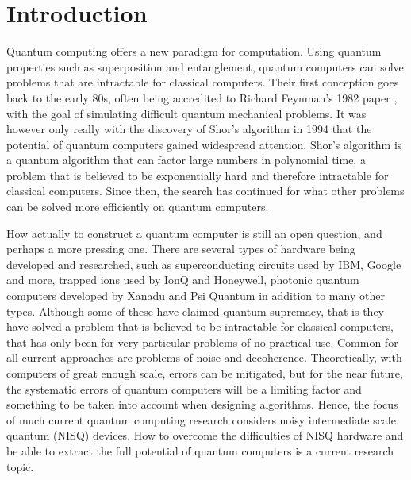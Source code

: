 \chapter{Introduction}
Quantum computing offers a new paradigm for computation.
Using quantum properties such as superposition and entanglement, quantum computers can solve problems that are intractable for classical computers.
Their first conception goes back to the early 80s, often being accredited to Richard Feynman's 1982 paper \cite{feynman}, with the goal of simulating difficult quantum mechanical problems.
It was however only really with the discovery of Shor's algorithm in 1994 \cite{shor} that the potential of quantum computers gained widespread attention.
Shor's algorithm is a quantum algorithm that can factor large numbers in polynomial time, a problem that is believed to be exponentially hard and therefore intractable for classical computers.
Since then, the search has continued for what other problems can be solved more efficiently on quantum computers.

How actually to construct a quantum computer is still an open question, and perhaps a more pressing one.
There are several types of hardware being developed and researched, such as superconducting circuits used by IBM, Google and more, trapped ions used by IonQ and Honeywell, photonic quantum computers developed by Xanadu and Psi Quantum in addition to many other types.
Although some of these have claimed quantum supremacy, that is they have solved a problem that is believed to be intractable for classical computers, that has only been for very particular problems of no practical use.
Common for all current approaches are problems of noise and decoherence.
Theoretically, with computers of great enough scale, errors can be mitigated, but for the near future, the systematic errors of quantum computers will be a limiting factor and something to be taken into account when designing algorithms.
Hence, the focus of much current quantum computing research considers noisy intermediate scale quantum (NISQ) devices.
How to overcome the difficulties of NISQ hardware and be able to extract the full potential of quantum computers is a current research topic.

